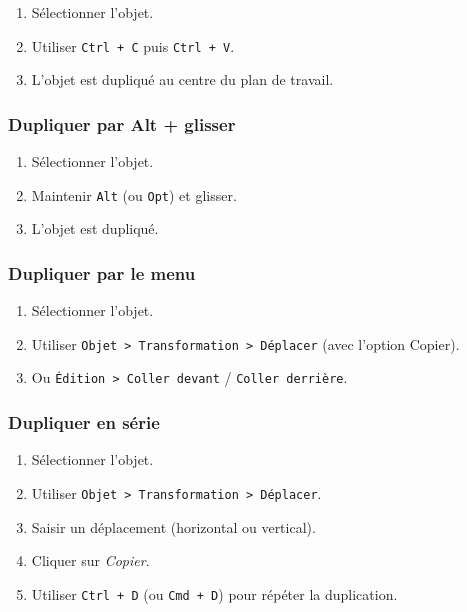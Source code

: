 \begin{enumerate}
    \item Sélectionner l'objet.
    \item Utiliser \texttt{Ctrl + C} puis \texttt{Ctrl + V}.
    \item L'objet est dupliqué au centre du plan de travail.
\end{enumerate}

\subsubsection{Dupliquer par Alt + glisser}

\begin{enumerate}
    \item Sélectionner l'objet.
    \item Maintenir \texttt{Alt} (ou \texttt{Opt}) et glisser.
    \item L'objet est dupliqué.
\end{enumerate}

\subsubsection{Dupliquer par le menu}

\begin{enumerate}
    \item Sélectionner l'objet.
    \item Utiliser \texttt{Objet > Transformation > Déplacer} (avec l'option Copier).
    \item Ou \texttt{Édition > Coller devant} / \texttt{Coller derrière}.
\end{enumerate}

\subsubsection{Dupliquer en série}

\begin{enumerate}
    \item Sélectionner l'objet.
    \item Utiliser \texttt{Objet > Transformation > Déplacer}.
    \item Saisir un déplacement (horizontal ou vertical).
    \item Cliquer sur \emph{Copier}.
    \item Utiliser \texttt{Ctrl + D} (ou \texttt{Cmd + D}) pour répéter la duplication.
\end{enumerate}

